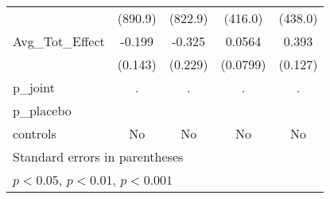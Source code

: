 {\begin{tabular}{l*{4}{c}}
            &     (890.9)         &     (822.9)         &     (416.0)         &     (438.0)         \\
\addlinespace
Avg\_Tot\_Effect&      -0.199         &      -0.325         &      0.0564         &       0.393\sym{**} \\
            &     (0.143)         &     (0.229)         &    (0.0799)         &     (0.127)         \\
\midrule
p\_joint     &           .         &           .         &           .         &           .         \\
p\_placebo   &                     &                     &                     &                     \\
controls    &          No         &          No         &          No         &          No         \\
\bottomrule
\multicolumn{5}{l}{\footnotesize Standard errors in parentheses}\\
\multicolumn{5}{l}{\footnotesize \sym{*} \(p<0.05\), \sym{**} \(p<0.01\), \sym{***} \(p<0.001\)}\\
\end{tabular}
}
